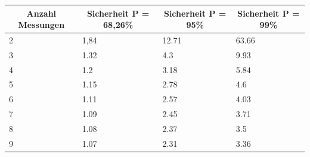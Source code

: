 \documentclass[SSS_Laborbericht.tex]{subfiles}
\begin{document}
\begin{table}[H]
\begin{tabular}{|l|l|l|l|}
\hline
\multicolumn{1}{|c|}{Anzahl Messungen} & \multicolumn{1}{c|}{Sicherheit P = 68,26\%} & \multicolumn{1}{c|}{Sicherheit P = 95\%} & \multicolumn{1}{c|}{Sicherheit P = 99\%} \\ \hline
2                                                              & 1,84                                                                & 12.71                                                            & 63.66                                                            \\ \hline
3                                                              & 1.32                                                                & 4.3                                                              & 9.93                                                             \\ \hline
4                                                              & 1.2                                                                 & 3.18                                                             & 5.84                                                             \\ \hline
5                                                              & 1.15                                                                & 2.78                                                             & 4.6                                                              \\ \hline
6                                                              & 1.11                                                                & 2.57                                                             & 4.03                                                             \\ \hline
7                                                              & 1.09                                                                & 2.45                                                             & 3.71                                                             \\ \hline
8                                                              & 1.08                                                                & 2.37                                                             & 3.5                                                              \\ \hline
9                                                              & 1.07                                                                & 2.31                                                             & 3.36                                                             \\ \hline

\end{tabular}
\end{table}
\end{document}

